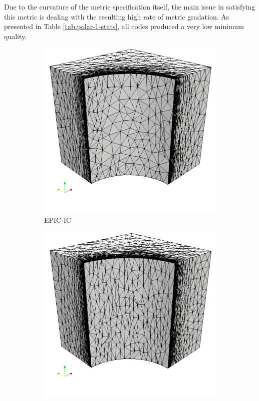 \documentclass[3p,times,procedia,number]{elsarticle}
\begin{document}
Due to the curvature of the metric specification itself,
the main issue in satisfying this metric is dealing with the
resulting high rate of metric gradation.
As presented in Table \ref{tab:polar-1-stats}, all codes produced
a very low minimum quality.

\begin{figure}
\begin{subfigure}{.24\textwidth}
\centering
\includegraphics[width=\textwidth]{epic-ic-cube-cylinder-polar-1.png}
\caption{EPIC-IC}
\end{subfigure}
\begin{subfigure}{.24\textwidth}
\centering
\includegraphics[width=\textwidth]{epic-ics-cube-cylinder-polar-1.png}

\end{subfigure}
\end{figure}
\end{document}
